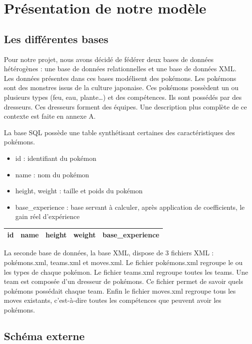 \section{Présentation de notre modèle}

\subsection{Les différentes bases}

Pour notre projet, nous avons décidé de fédérer deux bases de données hétérogènes : une base de données relationnelles et une base de données XML. Les données présentes dans ces bases modélisent des pokémons. Les pokémons sont des monstres issus de la culture japonaise. Ces pokémons possèdent un ou plusieurs types (feu, eau, plante…) et des compétences. Ils sont possédés par des dresseurs. Ces dresseurs forment des équipes. Une description plus complète de ce contexte est faite en annexe A.

La base SQL possède une table synthétisant certaines des caractéristiques des pokémons.
\begin{itemize}
\item id : identifiant du pokémon	
\item name : nom du pokémon	
\item height, weight : taille et poids du pokémon	
\item base\_experience : base servant à calculer, après application de coefficients, le gain réel d'expérience
\end{itemize}

\begin{tabular}{|c|c|c|c|c|}
 \hline
 id & name & height & weight & base\_experience \\
 \hline
\end{tabular}

La seconde base de données, la base XML, dispose de 3 fichiers XML : pokémons.xml, teams.xml et moves.xml. Le fichier pokémons.xml regroupe le ou les types de chaque pokémon. Le fichier teams.xml regroupe toutes les teams. Une team est composée d'un dresseur de pokémons. Ce fichier permet de savoir quels pokémons possédait chaque team. Enfin le fichier moves.xml regroupe tous les moves existants, c'est-à-dire toutes les compétences que peuvent avoir les pokémons.

 \subsection{Schéma externe}

